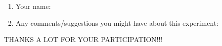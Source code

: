\documentclass{article}
\title{}
\author{Debugging experiment - Exit survey for population 1}
\date{July 30, 2003}
\begin{document}
\maketitle
\begin{flushleft}
\vspace{0.5in}

\thispagestyle{empty}


\begin{enumerate}
\item{Your name:}
\item{Any comments/suggestions you might have about this experiment:}
\end{enumerate}


\vspace{3in}
\begin{center}
THANKS A LOT FOR YOUR PARTICIPATION!!!
\end{center}

\end{flushleft}
\end{document}
